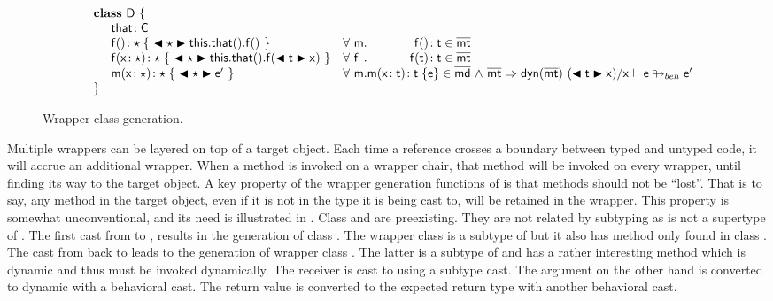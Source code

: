 \documentclass[a4paper,USenglish]{tex/lipics-v2016}
\begin{document}
\begin{figure}[!ht]
\[\begin{array}{@{}ll@{}l@{}r@{~}c@{~}r}
\SP \class~\D~\{\\
\SPP \Fdef \that \C\\ 
\SPP   \Mdefz\f\any{~\BehCast\any{\Get{{\Get\this\that}}\f}~}
&  \All \m  \Mtype\f{}\t \in \bmt\\
\SPP   \Mdef\f\x\any\any{~\BehCast\any{\Set{\Get\this\that}\f{\BehCast\t\x}}~}
&  \All \f  \Mtype\f\t\t \in \bmt\\
\SPP   \Mdef\m\x\any\any {~\BehCast\any{{\ep}}~}
&  \All \m \Mdef\m\x\t\t\e\in\b\md  &\wedge& \rtranst{\bmt}{\dyn{\bmt}}{(\BehCast\t\x)}\x{\e}{\ep}\\
\SP \}\\
\end{array}\]
\hrulefill
  \caption{Wrapper class generation.}\label{wrap}
\end{figure}

Multiple wrappers can be layered on top of a target object. Each time a
reference crosses a boundary between typed and untyped code, it will accrue
an additional wrapper. When a method is invoked on a wrapper chair, that
method will be invoked on every wrapper, until finding its way to the target
object. A key property of the wrapper generation functions of 
is that methods should not be ``lost''. That is to say, any method in the
target object, even if it is not in the type it is being cast to, will be
retained in the wrapper.  This property is somewhat unconventional, and its
need is illustrated in . Class \C and \D are preexisting.  They
are not related by subtyping as \any is not a supertype of \E. The first
cast from \C to \D, results in the generation of class . The
wrapper class is a subtype of \D but it also has method \mp only found in
class \C.  The cast from  back to \C leads to the generation of
wrapper class . The latter is a subtype of \C and has a rather
interesting method \m which is dynamic and thus must be invoked dynamically.
The receiver is cast to \any using a subtype cast. The argument on the other
hand is converted to dynamic with a behavioral cast. The return value is
converted to the expected return type with another behavioral cast.
\end{document}
